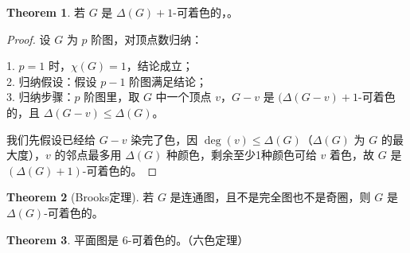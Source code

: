 \documentclass[oneside]{book}
\theoremstyle{definition}
\newtheorem{theorem}{Theorem}[section]
\begin{document}
\begin{theorem}
	若 \( G \) 是 \( \Delta(G)+1 \)-可着色的，。
\end{theorem}

\begin{proof}
	设 \( G \) 为 \( p \) 阶图，对顶点数归纳：
	
	1. \( p=1 \) 时，\( \chi(G)=1 \)，结论成立；\\
	2. 归纳假设：假设 \( p-1 \) 阶图满足结论；\\
	3. 归纳步骤：\(p\) 阶图里，取 \( G \) 中一个顶点 \( v \)，\( G-v \) 是 \( (\Delta(G-v)+1 \)-可着色的，且 \( \Delta(G-v) \leq\Delta(G) \)。
	
	我们先假设已经给 \(G-v\) 染完了色，因 \( \deg(v) \leq \Delta(G) \)（\( \Delta(G) \) 为 \( G \) 的最大度），\( v \) 的邻点最多用 \( \Delta(G) \) 种颜色，剩余至少1种颜色可给 \( v \) 着色，故 \( G \) 是 \( (\Delta(G)+1) \)-可着色的。
\end{proof}

\begin{theorem}[Brooks定理]
	若 \( G \) 是连通图，且不是完全图也不是奇圈，则 \( G \) 是 \( \Delta(G) \)-可着色的。
\end{theorem}

\begin{theorem}
	平面图是 6-可着色的。（六色定理）
\end{theorem}
\end{document}
